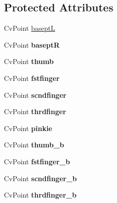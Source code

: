 \subsection*{Protected Attributes}
\begin{DoxyCompactItemize}
\item 
CvPoint \hyperlink{classFullhand_af41f907b9a1a9db4c55ca8e79f0a7b02}{baseptL}
\item 
\hypertarget{classFullhand_a7a733bddc575276da9904f75113a572f}{
CvPoint {\bfseries baseptR}}
\label{classFullhand_a7a733bddc575276da9904f75113a572f}

\item 
\hypertarget{classFullhand_a0deb4507b0a9e6c8fae5788d475947e2}{
CvPoint {\bfseries thumb}}
\label{classFullhand_a0deb4507b0a9e6c8fae5788d475947e2}

\item 
\hypertarget{classFullhand_a75e7cbeac6cb249b0d2b528d33fd1e76}{
CvPoint {\bfseries fstfinger}}
\label{classFullhand_a75e7cbeac6cb249b0d2b528d33fd1e76}

\item 
\hypertarget{classFullhand_a08901fe0947c95d1dcb9dc1aae849598}{
CvPoint {\bfseries scndfinger}}
\label{classFullhand_a08901fe0947c95d1dcb9dc1aae849598}

\item 
\hypertarget{classFullhand_a364ca0c7aa0ca2e5cac78493d20ba524}{
CvPoint {\bfseries thrdfinger}}
\label{classFullhand_a364ca0c7aa0ca2e5cac78493d20ba524}

\item 
\hypertarget{classFullhand_ad99be1bdd835a6a1c6e727e785927fdf}{
CvPoint {\bfseries pinkie}}
\label{classFullhand_ad99be1bdd835a6a1c6e727e785927fdf}

\item 
\hypertarget{classFullhand_a94222756d853321311764f01778fded3}{
CvPoint {\bfseries thumb\_\-b}}
\label{classFullhand_a94222756d853321311764f01778fded3}

\item 
\hypertarget{classFullhand_a056e8cfb3aebd5987963ac405b16f96e}{
CvPoint {\bfseries fstfinger\_\-b}}
\label{classFullhand_a056e8cfb3aebd5987963ac405b16f96e}

\item 
\hypertarget{classFullhand_adba840b90e831e5ec8ee231a3d037c1a}{
CvPoint {\bfseries scndfinger\_\-b}}
\label{classFullhand_adba840b90e831e5ec8ee231a3d037c1a}

\item 
\hypertarget{classFullhand_acb8cb249608a178a45857b71b005452f}{
CvPoint {\bfseries thrdfinger\_\-b}}
\label{classFullhand_acb8cb249608a178a45857b71b005452f}


\end{DoxyCompactItemize}
